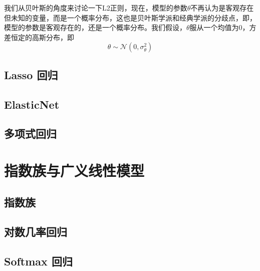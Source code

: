 我们从贝叶斯的角度来讨论一下L2正则，现在，模型的参数$\theta$不再认为是客观存在但未知的变量，而是一个概率分布，这也是贝叶斯学派和经典学派的分歧点，即，模型的参数是客观存在的，还是一个概率分布。我们假设，$\theta$服从一个均值为0，方差恒定的高斯分布，即
\begin{equation}
	\theta \sim \mathcal{N}(0, \sigma_\theta^2)
\end{equation}










\subsection{Lasso 回归} %
\label{sub:lasso_回归}




\subsection{ElasticNet} %
\label{sub:elasticnet}


\subsection{多项式回归} %
\label{sub:多项式回归}



\section{指数族与广义线性模型} %
\label{sec:指数族与广义线性模型}
\subsection{指数族} %
\label{sub:指数族}

\subsection{对数几率回归} %
\label{sub:对数几率回归}


\subsection{Softmax 回归} %
\label{sub:softmax_回归}

